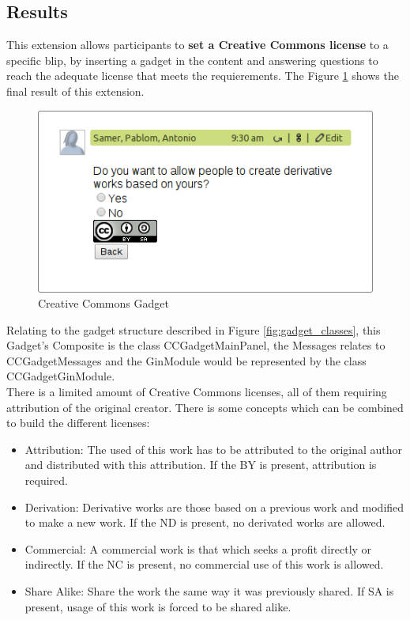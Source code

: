 \subsection{Results}
This extension allows participants to \textbf{set a Creative Commons license} to a specific blip, by inserting a gadget in the content and answering questions to reach the adequate license that meets the requierements. The Figure \ref{fig:cc_gadget} shows the final result of this extension.
\begin{figure}[h]
  \center
    \includegraphics[keepaspectratio, scale=0.7]{Media/Captures/Extensions/CCGadget.png}
  \caption{Creative Commons Gadget}
  \label{fig:cc_gadget}
\end{figure}
Relating to the gadget structure described in Figure \ref{fig:gadget_classes}, this Gadget's Composite is the class CCGadgetMainPanel, the Messages relates to CCGadgetMessages and the GinModule would be represented by the class CCGadgetGinModule.\\[.2cm]
There is a limited amount of Creative Commons licenses, all of them requiring attribution of the original creator. There is some concepts which can be combined to build the different licenses:
\begin{itemize}
  \item Attribution: The used of this work has to be attributed to the original author and distributed with this attribution. If the BY is present, attribution is required.
  \item Derivation: Derivative works are those based on a previous work and modified to make a new work. If the ND is present, no derivated works are allowed.
  \item Commercial: A commercial work is that which seeks a profit directly or indirectly. If the NC is present, no commercial use of this work is allowed.
  \item Share Alike: Share the work the same way it was previously shared. If SA is present, usage of this work is forced to be shared alike.
\end{itemize}

